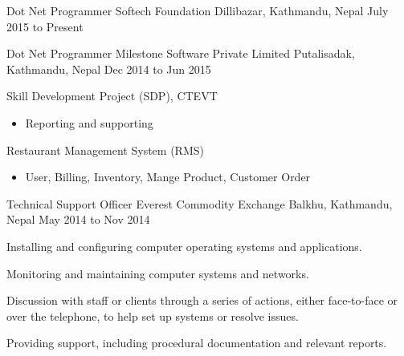 

\begin{cventries}

  \cventry
    {Dot Net Programmer} %
    {Softech Foundation} %
    {Dillibazar, Kathmandu, Nepal} %
    {July 2015 to Present} %
    {}
 
  \cventry
    {Dot Net Programmer} %
    {Milestone Software Private Limited} %
    {Putalisadak, Kathmandu, Nepal} %
    {Dec 2014 to Jun 2015} %
    {
      \begin{cvitems} %
        \item {Skill Development Project (SDP), CTEVT}
        \begin{itemize}
        \item {Reporting and supporting}
        \end{itemize}
        \item {Restaurant Management System (RMS)}
        \begin{itemize}
        \item {User, Billing, Inventory, Mange Product, Customer Order}
        \end{itemize}
      \end{cvitems}
    }

  \cventry
    {Technical Support Officer} %
    {Everest Commodity Exchange} %
    {Balkhu, Kathmandu, Nepal} %
    {May 2014 to Nov 2014} %
    {
      \begin{cvitems} %
        \item {Installing and configuring computer operating systems and applications.}
        \item {Monitoring and maintaining computer systems and networks.}
        \item{Discussion with staff or clients through a series of actions, either face-to-face or over the telephone, to help set up systems or resolve issues.}
		\item{Providing support, including procedural documentation and relevant reports.}
      \end{cvitems} 
    }


\end{cventries}
